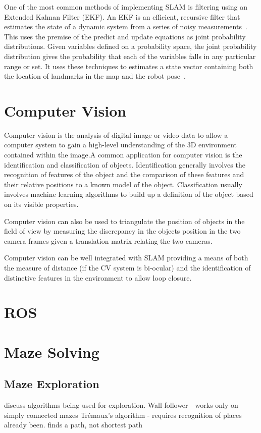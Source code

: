 One of the most common methods of implementing SLAM is filtering using an
Extended Kalman Filter (EKF). An EKF is an efficient, recursive filter
that estimates the state of a dynamic system from a series of noisy measurements~\cite{fox2003bayesian}.
This uses the premise of the predict and update equations as joint probability
distributions. Given variables defined on a probability space, the joint
probability distribution gives the probability that each of the variables falls in any
particular range or set. It uses these techniques to estimates a state vector containing
both the location of landmarks in the map and the robot pose~\cite{huang2007convergence}.


\section{Computer Vision}\label{litreview/cv}
Computer vision is the analysis of digital image or video data to allow a computer
system to gain a high-level understanding of the 3D environment contained within
the image\cite{CVBallard}.A common application for computer vision is the identification and classification
of objects. Identification generally involves the recognition of features of the
object and the comparison of these features and their relative positions to a
known model of the object. Classification usually involves machine learning
algorithms to build up a definition of the object based on its visible properties\cite{CVpaoletti2018new}.

Computer vision can also be used to triangulate the position of objects in the
field of view by measuring the discrepancy in the objects position in the two camera
frames given a translation matrix relating the two cameras.

Computer vision can be well integrated with SLAM providing a means of both the measure
of distance (if the CV system is bi-ocular) and the identification of distinctive
features in the environment to allow loop closure\cite{CVho2006loop}.

\section{ROS}\label{litreview/ROS}

\section{Maze Solving}\label{litreview/maze}
\subsection{Maze Exploration}\label{litreview/maze/exploration}
discuss algorithms being used for exploration. 
Wall follower - works only on simply connected mazes
Trémaux's algorithm - requires recognition of places already been. finds a path, not shortest path	

